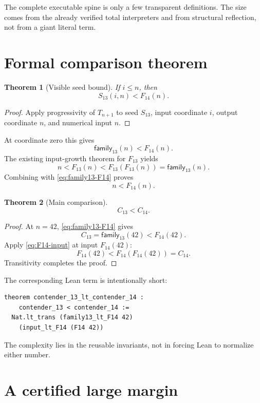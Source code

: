 \documentclass[11pt]{article}
\newtheorem{theorem}{Theorem}[section]
\theoremstyle{definition}
\begin{document}
The complete executable spine is only a few transparent definitions.  The
size comes from the already verified total interpreters and from structural
reflection, not from a giant literal term.

\section{Formal comparison theorem}

\begin{theorem}[Visible seed bound]
If $i\le n$, then
\[
  S_{13}(i,n)<F_{14}(n).
\]
\end{theorem}
\begin{proof}
Apply progressivity of $T_{n+1}$ to seed $S_{13}$, input coordinate $i$, output
coordinate $n$, and numerical input $n$.
\end{proof}

At coordinate zero this gives
\begin{equation}
  \mathsf{family}_{13}(n)<F_{14}(n).
\label{eq:family13-F14}
\end{equation}
The existing input-growth theorem for $F_{13}$ yields
\[
  n<F_{13}(n)<F_{13}(F_{13}(n))
    =\mathsf{family}_{13}(n).
\]
Combining with \cref{eq:family13-F14} proves
\begin{equation}
  n<F_{14}(n).
\label{eq:F14-input}
\end{equation}

\begin{theorem}[Main comparison]
\[
  C_{13}<C_{14}.
\]
\end{theorem}
\begin{proof}
At $n=42$, \cref{eq:family13-F14} gives
\[
  C_{13}=\mathsf{family}_{13}(42)<F_{14}(42).
\]
Apply \cref{eq:F14-input} at input $F_{14}(42)$:
\[
  F_{14}(42)<F_{14}(F_{14}(42))=C_{14}.
\]
Transitivity completes the proof.
\end{proof}

The corresponding Lean term is intentionally short:
\begin{lstlisting}
theorem contender_13_lt_contender_14 :
    contender_13 < contender_14 :=
  Nat.lt_trans (family13_lt_F14 42)
    (input_lt_F14 (F14 42))
\end{lstlisting}
The complexity lies in the reusable invariants, not in forcing Lean to
normalize either number.

\section{A certified large margin}
\end{document}
